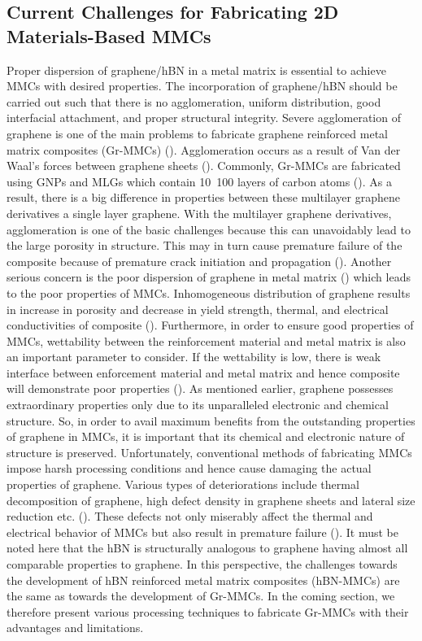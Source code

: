 \subsection{Current Challenges for Fabricating 2D Materials-Based MMCs}

Proper dispersion of graphene/hBN in a metal matrix is essential to achieve MMCs with desired properties. The incorporation of graphene/hBN should be carried out such that there is no agglomeration, uniform distribution, good interfacial attachment, and proper structural integrity. Severe agglomeration of graphene is one of the main problems to fabricate graphene reinforced metal matrix composites (Gr-MMCs) (\cite {hu2016laser}). Agglomeration occurs as a result of Van der Waal’s forces between graphene sheets (\cite {zandiatashbar2012mechanical}). Commonly, Gr-MMCs are fabricated using GNPs and MLGs which contain 10~100 layers of carbon atoms (\cite {nieto2017graphene}). As a result, there is a big difference in properties between these multilayer graphene derivatives a single layer graphene. With the multilayer graphene derivatives, agglomeration is one of the basic challenges because this can unavoidably lead to the large porosity in structure. This may in turn cause premature failure of the composite because of premature crack initiation and propagation (\cite {song2016microscopic, chu2014enhanced, li2014highly}). Another serious concern is the poor dispersion of graphene in metal matrix (\cite {chu2018anisotropic}) which leads to the poor properties of MMCs. Inhomogeneous distribution of graphene results in increase in porosity and decrease in yield strength, thermal, and electrical conductivities of composite (\cite {asgharzadeh2017synthesis}). Furthermore, in order to ensure good properties of MMCs, wettability between the reinforcement material and metal matrix is also an important parameter to consider. If the wettability is low, there is weak interface between enforcement material and metal matrix and hence composite will demonstrate poor properties (\cite {kauling2018worldwide}). As mentioned earlier, graphene possesses extraordinary properties only due to its unparalleled electronic and chemical structure. So, in order to avail maximum benefits from the outstanding properties of graphene in MMCs, it is important that its chemical and electronic nature of structure is preserved. Unfortunately, conventional methods of fabricating MMCs impose harsh processing conditions and hence cause damaging the actual properties of graphene. Various types of deteriorations include thermal decomposition of graphene, high defect density in graphene sheets and lateral size reduction etc. (\cite {nieto2012synthesis, perez2014microstructural}). These defects not only miserably affect the thermal and electrical behavior of MMCs but also result in premature failure (\cite {chu2018largely}). It must be noted here that the hBN is structurally analogous to graphene having almost all comparable properties to graphene. In this perspective, the challenges towards the development of hBN reinforced metal matrix composites (hBN-MMCs) are the same as towards the development of Gr-MMCs.  In the coming section, we therefore present various processing techniques to fabricate Gr-MMCs with their advantages and limitations. 

